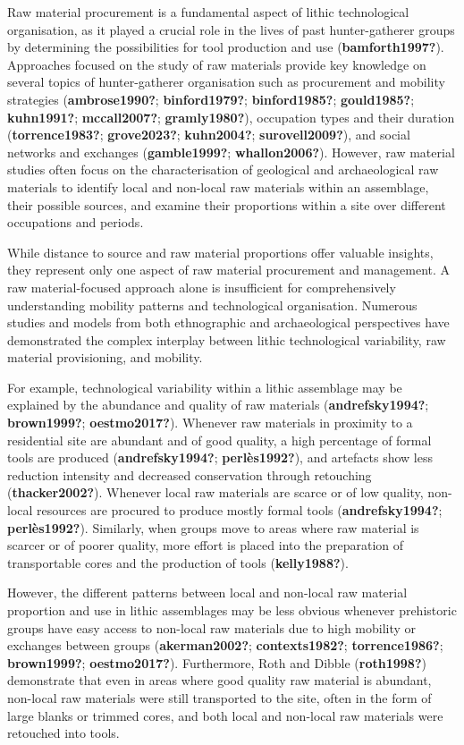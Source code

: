 \documentclass[
  a4paper,
  DIV=11,
  numbers=noendperiod]{scrreprt}
\begin{document}
Raw material procurement is a fundamental aspect of lithic technological
organisation, as it played a crucial role in the lives of past
hunter-gatherer groups by determining the possibilities for tool
production and use (\textbf{bamforth1997?}). Approaches focused on the
study of raw materials provide key knowledge on several topics of
hunter-gatherer organisation such as procurement and mobility strategies
(\textbf{ambrose1990?}; \textbf{binford1979?}; \textbf{binford1985?};
\textbf{gould1985?}; \textbf{kuhn1991?}; \textbf{mccall2007?};
\textbf{gramly1980?}), occupation types and their duration
(\textbf{torrence1983?}; \textbf{grove2023?}; \textbf{kuhn2004?};
\textbf{surovell2009?}), and social networks and exchanges
(\textbf{gamble1999?}; \textbf{whallon2006?}). However, raw material
studies often focus on the characterisation of geological and
archaeological raw materials to identify local and non-local raw
materials within an assemblage, their possible sources, and examine
their proportions within a site over different occupations and periods.

While distance to source and raw material proportions offer valuable
insights, they represent only one aspect of raw material procurement and
management. A raw material-focused approach alone is insufficient for
comprehensively understanding mobility patterns and technological
organisation. Numerous studies and models from both ethnographic and
archaeological perspectives have demonstrated the complex interplay
between lithic technological variability, raw material provisioning, and
mobility.

For example, technological variability within a lithic assemblage may be
explained by the abundance and quality of raw materials
(\textbf{andrefsky1994?}; \textbf{brown1999?}; \textbf{oestmo2017?}).
Whenever raw materials in proximity to a residential site are abundant
and of good quality, a high percentage of formal tools are produced
(\textbf{andrefsky1994?}; \textbf{perlès1992?}), and artefacts show less
reduction intensity and decreased conservation through retouching
(\textbf{thacker2002?}). Whenever local raw materials are scarce or of
low quality, non-local resources are procured to produce mostly formal
tools (\textbf{andrefsky1994?}; \textbf{perlès1992?}). Similarly, when
groups move to areas where raw material is scarcer or of poorer quality,
more effort is placed into the preparation of transportable cores and
the production of tools (\textbf{kelly1988?}).

However, the different patterns between local and non-local raw material
proportion and use in lithic assemblages may be less obvious whenever
prehistoric groups have easy access to non-local raw materials due to
high mobility or exchanges between groups (\textbf{akerman2002?};
\textbf{contexts1982?}; \textbf{torrence1986?}; \textbf{brown1999?};
\textbf{oestmo2017?}). Furthermore, Roth and Dibble (\textbf{roth1998?})
demonstrate that even in areas where good quality raw material is
abundant, non-local raw materials were still transported to the site,
often in the form of large blanks or trimmed cores, and both local and
non-local raw materials were retouched into tools.
\end{document}
